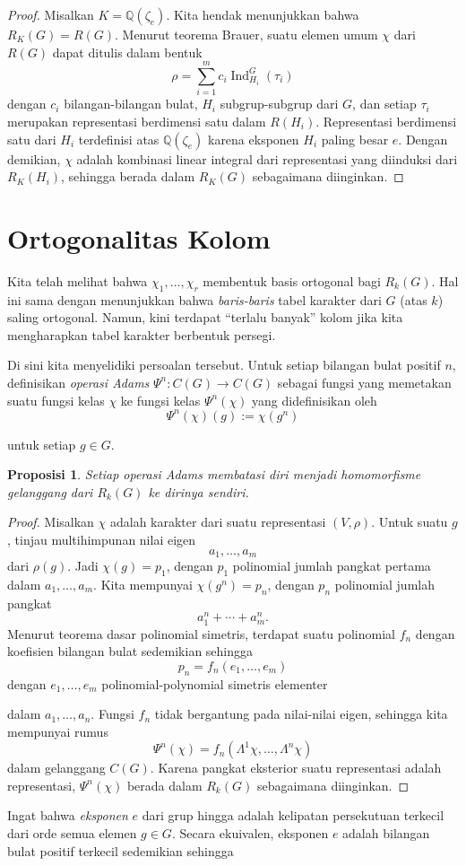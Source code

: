 \documentclass[12pt]{article}
\theoremstyle{plain}
\newtheorem{proposition}[theorem]{Proposisi}
\theoremstyle{definition}
\theoremstyle{remark}
\numberwithin{equation}{section}
\begin{document}
\begin{proof}
Misalkan $K=\mathbb{Q}(\zeta_e)$. Kita hendak menunjukkan bahwa $R_K(G)=R(G)$.
Menurut teorema Brauer, suatu elemen umum $\chi$ dari $R(G)$ dapat ditulis
dalam bentuk
\[
\rho = \sum_{i=1}^m c_i\operatorname{Ind}_{H_i}^G(\tau_i)
\]
dengan $c_i$ bilangan-bilangan bulat, $H_i$ subgrup-subgrup dari $G$,
dan setiap $\tau_i$ merupakan representasi berdimensi satu dalam $R(H_i)$.
Representasi berdimensi satu dari $H_i$ terdefinisi atas
$\mathbb{Q}(\zeta_e)$ karena eksponen $H_i$ paling besar $e$.
Dengan demikian, $\chi$ adalah kombinasi linear integral dari
representasi yang diinduksi dari $R_K(H_i)$, sehingga berada dalam
$R_K(G)$ sebagaimana diinginkan.

\end{proof}

\section{Ortogonalitas Kolom}
Kita telah melihat bahwa $\chi_1,\ldots,\chi_r$ membentuk basis ortogonal bagi
$R_k(G)$. Hal ini sama dengan menunjukkan bahwa \emph{baris-baris} tabel karakter
dari $G$ (atas $k$) saling ortogonal.
Namun, kini terdapat ``terlalu banyak'' kolom jika kita mengharapkan
tabel karakter berbentuk persegi.

Di sini kita menyelidiki persoalan tersebut.
Untuk setiap bilangan bulat positif $n$, definisikan \emph{operasi Adams}
$\Psi^n : C(G) \to C(G)$ sebagai fungsi yang memetakan
suatu fungsi kelas $\chi$ ke fungsi kelas $\Psi^n(\chi)$ yang didefinisikan oleh
\[
\Psi^n(\chi)(g) := \chi(g^n)
\]

untuk setiap $g \in G$.
\begin{proposition}
Setiap operasi Adams membatasi diri menjadi homomorfisme gelanggang
dari $R_k(G)$ ke dirinya sendiri.

\end{proposition}
\begin{proof}
Misalkan $\chi$ adalah karakter dari suatu representasi $(V,\rho)$.
Untuk suatu $g$, tinjau multihimpunan nilai eigen
\[
a_1,\ldots, a_m
\]
dari $\rho(g)$.
Jadi $\chi(g)=p_1$, dengan $p_1$ polinomial jumlah pangkat pertama
dalam $a_1,\ldots, a_m$.
Kita mempunyai $\chi(g^n)=p_n$, dengan $p_n$ polinomial jumlah pangkat
\[
a_1^n + \cdots + a_m^n.
\]
Menurut teorema dasar polinomial simetris, terdapat suatu
polinomial $f_n$ dengan koefisien bilangan bulat sedemikian sehingga
\[
p_n = f_n(e_1,\ldots,e_m)
\]
dengan $e_1,\ldots,e_m$ polinomial-polynomial simetris elementer

dalam $a_1,\ldots,a_n$.
Fungsi $f_n$ tidak bergantung pada nilai-nilai eigen, sehingga kita mempunyai
rumus
\[
\Psi^n(\chi) = f_n(\Lambda^1 \chi, \ldots, \Lambda^n \chi)
\]
dalam gelanggang $C(G)$. Karena pangkat eksterior suatu representasi adalah
representasi, $\Psi^n(\chi)$ berada dalam $R_k(G)$ sebagaimana diinginkan.

\end{proof}
Ingat bahwa \emph{eksponen} $e$ dari grup hingga adalah kelipatan persekutuan terkecil
dari orde semua elemen $g \in G$.
Secara ekuivalen, eksponen $e$ adalah bilangan bulat positif terkecil sedemikian sehingga
\end{document}
